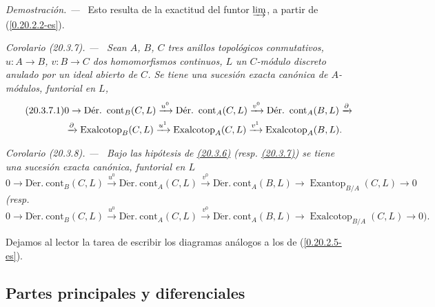 \documentclass[10pt,oneside]{book}
\makeatletter
\newcommand{\sref}[1]{\textup{(\ref{#1})}}
\newcommand{\setmanualcurrentlabel}[1]{\def\@currentlabel{#1}}
\newenvironment{corollary}[1][]{%
  \setmanualcurrentlabel{#1}\par\medskip\noindent\itshape Corolario (#1). ---\ }{\par}
\newenvironment{proof}{%
  \par\medskip\noindent\textit{Demostración. ---\ }}{\par}
\makeatother
\begin{document}
\begin{proof}
Esto resulta de la exactitud del funtor $\varinjlim$, a partir de
\sref{0.20.2.2-es}.
\end{proof}

\begin{corollary}[20.3.7]
\label{0.20.3.7-es}
Sean $A$, $B$, $C$ tres anillos topológicos conmutativos, $u:A\to B$,
$v:B\to C$ dos homomorfismos continuos, $L$ un $C$-módulo discreto anulado
por un ideal abierto de $C$. Se tiene una sucesión exacta canónica de $A$-módulos,
funtorial en $L$,
\begin{align}
\tag{20.3.7.1}
\label{0.20.3.7.1-es}
  &0\to\operatorname{D\acute{e}r.\ cont}_B(C,L)\xrightarrow{u^0}
  \operatorname{D\acute{e}r.\ cont}_A(C,L)\xrightarrow{v^0}
  \operatorname{D\acute{e}r.\ cont}_A(B,L)\xrightarrow{\partial} \\
  &\xrightarrow{\partial}\operatorname{Exalcotop}_B(C,L)\xrightarrow{u^1}
  \operatorname{Exalcotop}_A(C,L)\xrightarrow{v^1}
  \operatorname{Exalcotop}_A(B,L). \notag
\end{align}
\end{corollary}

\begin{corollary}[20.3.8]
\label{0.20.3.8-es}
Bajo las hipótesis de \hyperref[0.20.3.5-es]{\textup{(20.3.6)}} \textup{(resp.
\hyperref[0.20.3.6-es]{\textup{(20.3.7)}})} se tiene una sucesión exacta canónica, funtorial en $L$
\begin{equation}
\tag{20.3.8.1}
\label{0.20.3.8.1-es}
  0\to\operatorname{D\acute{e}r.\ cont}_B(C,L)\xrightarrow{u^0}
  \operatorname{D\acute{e}r.\ cont}_A(C,L)\xrightarrow{v^0}
  \operatorname{D\acute{e}r.\ cont}_A(B,L)\to
  \operatorname{Exantop}_{B/A}(C,L)\to0
\end{equation}
\textup{(resp.}
\begin{equation}
\tag{20.3.8.2}
\label{0.20.3.8.2-es}
  0\to\operatorname{D\acute{e}r.\ cont}_B(C,L)\xrightarrow{u^0}
  \operatorname{D\acute{e}r.\ cont}_A(C,L)\xrightarrow{v^0}
  \operatorname{D\acute{e}r.\ cont}_A(B,L)\to
  \operatorname{Exalcotop}_{B/A}(C,L)\to0\text{).}
\end{equation}
\end{corollary}

Dejamos al lector la tarea de escribir los diagramas análogos a los de
\sref{0.20.2.5-es}.

\subsection{Partes principales y diferenciales}
\label{subsection:0.20.4-es}
\end{document}
